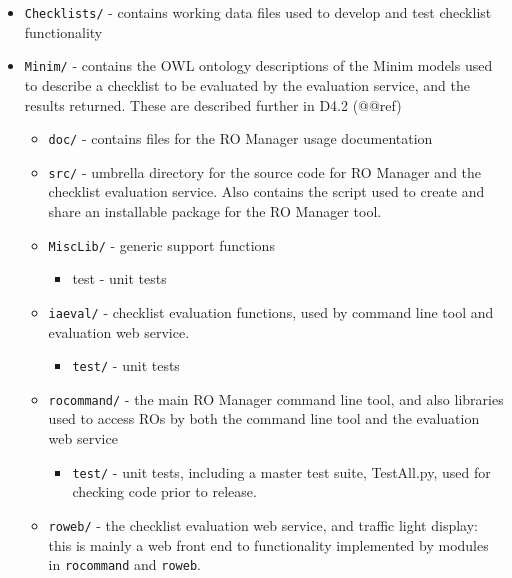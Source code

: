 \documentclass[11pt,oneside]{article}
\begin{document}
\begin{itemize}

\item \texttt{Checklists/} - contains working data files used to develop and test checklist functionality
\item \texttt{Minim/} - contains the OWL ontology descriptions of the Minim models used to describe a checklist to be evaluated by the evaluation service, and the results returned.  These are described further in D4.2 (@@ref)
\begin{itemize}

\item \texttt{doc/} - contains files for the RO Manager usage documentation
\item \texttt{src/} - umbrella directory for the source code for RO Manager and the checklist evaluation service.  Also contains the script used to create and share an installable package for the RO Manager tool.
\item \texttt{MiscLib/} - generic support functions
\begin{itemize}

\item test - unit tests
\end{itemize}


\item \texttt{iaeval/} - checklist evaluation functions, used by command line tool and evaluation web service.
\begin{itemize}

\item \texttt{test/} - unit tests
\end{itemize}


\item \texttt{rocommand/} - the main RO Manager command line tool, and also libraries used to access ROs by both the command line tool and the evaluation web service
\begin{itemize}

\item \texttt{test/} - unit tests, including a master test suite, TestAll.py, used for checking code prior to release.
\end{itemize}


\item \texttt{roweb/} - the checklist evaluation web service, and traffic light display: this is mainly a web front end to functionality implemented by modules in \texttt{rocommand} and \texttt{roweb}.
\begin{itemize}


\end{itemize}
\end{itemize}
\end{itemize}
\end{document}
